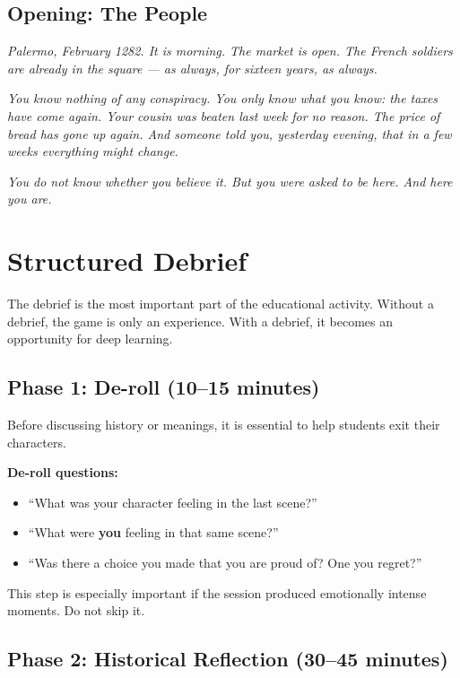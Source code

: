 \subsection{Opening: The People}

\begin{citbox}
\textit{Palermo, February 1282. It is morning. The market is open.
The French soldiers are already in the square --- as always, for
sixteen years, as always.}

\textit{You know nothing of any conspiracy. You only know what you
know: the taxes have come again. Your cousin was beaten last week for
no reason. The price of bread has gone up again. And someone told you,
yesterday evening, that in a few weeks everything might change.}

\textit{You do not know whether you believe it. But you were asked to
be here. And here you are.}
\end{citbox}

\secsep

\section{Structured Debrief}

The debrief is the most important part of the educational activity.
Without a debrief, the game is only an experience. With a debrief,
it becomes an opportunity for deep learning.

\subsection{Phase 1: De-roll (10--15 minutes)}

Before discussing history or meanings, it is essential to help students
exit their characters.

\textbf{De-roll questions:}
\begin{itemize}[nosep]
  \item ``What was your character feeling in the last scene?''
  \item ``What were \textbf{you} feeling in that same scene?''
  \item ``Was there a choice you made that you are proud of?
    One you regret?''
\end{itemize}

This step is especially important if the session produced emotionally
intense moments. Do not skip it.

\subsection{Phase 2: Historical Reflection (30--45 minutes)}


